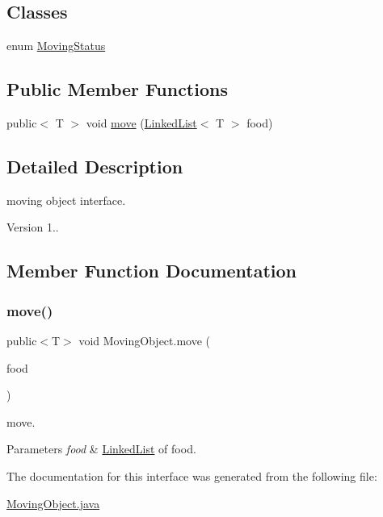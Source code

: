 \subsection*{Classes}
\begin{DoxyCompactItemize}
\item 
enum \mbox{\hyperlink{enum_moving_object_1_1_moving_status}{Moving\+Status}}
\end{DoxyCompactItemize}
\subsection*{Public Member Functions}
\begin{DoxyCompactItemize}
\item 
public$<$ T $>$ void \mbox{\hyperlink{interface_moving_object_a1e3f8b0a047bb3db15f64263ca4ea464}{move}} (\mbox{\hyperlink{class_linked_list}{Linked\+List}}$<$ T $>$ food)
\end{DoxyCompactItemize}


\subsection{Detailed Description}
moving object interface. \begin{DoxyVersion}{Version}
1.. 
\end{DoxyVersion}


\subsection{Member Function Documentation}
\mbox{\label{interface_moving_object_a1e3f8b0a047bb3db15f64263ca4ea464}} 
\subsubsection{\texorpdfstring{move()}{move()}}
{\footnotesize\ttfamily public$<$T$>$ void Moving\+Object.\+move (\begin{DoxyParamCaption}\item[{\mbox{\hyperlink{class_linked_list}{Linked\+List}}$<$ T $>$}]{food }\end{DoxyParamCaption})}

move. 
\begin{DoxyParams}{Parameters}
{\em food} & \mbox{\hyperlink{class_linked_list}{Linked\+List}} of food. \\
\hline
\end{DoxyParams}


The documentation for this interface was generated from the following file\+:\begin{DoxyCompactItemize}
\item 
\mbox{\hyperlink{_moving_object_8java}{Moving\+Object.\+java}}\end{DoxyCompactItemize}
